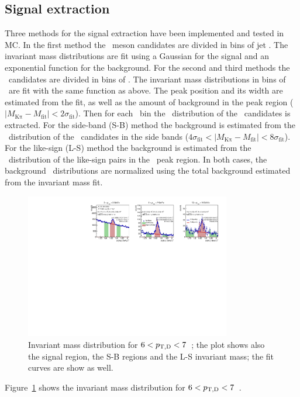 \subsection{Signal extraction}
Three methods for the signal extraction have been implemented and tested in MC.
In the first method the \Dzero\ meson candidates are divided in bins of jet \pt. The invariant mass distributions
are fit using a Gaussian for the signal and an exponential function for the background.
For the second and third methods the \Dzero\ candidates are divided in bins of \ptd. 
The invariant mass distributions in bins of \ptd\ are fit with the same function as above. The
peak position and its width are estimated from the fit, as well as the amount of background in the peak region ($|M_{\mathrm{K\pi}}-M_{\mathrm{fit}}| < 2\sigma_{\mathrm{fit}}$).
Then for each \ptd\ bin the \ptchjet\ distribution of the \Dzero\ candidates is extracted.
For the side-band (S-B) method the background is estimated from the \ptchjet\ distribution of the \Dzero\ candidates in the side bands (\mbox{$4\sigma_{\mathrm{fit}} < |M_{\mathrm{K\pi}}-M_{\mathrm{fit}}| < 8\sigma_{\mathrm{fit}}$}).
For the like-sign (L-S) method the background is estimated from the \ptchjet\ distribution of the like-sign pairs in the \Dzero\ peak region.
In both cases, the background \ptchjet\ distributions are normalized using the total background estimated from the invariant mass fit.
\begin{figure}[tbh]
\begin{center}
\includegraphics[width=0.8\textwidth]{img/HQ16_Simulation_InvMassSB}
 \caption{Invariant mass distribution for $6 < p_{\mathrm{T,D}} < 7$~\GeVc; the plot shows also the signal region, the S-B regions and the L-S invariant mass; the fit curves are show as well.} 
 \label{fig:HQ16_Simulation_InvMassSB}
\end{center}
\end{figure}
Figure~\ref{fig:HQ16_Simulation_InvMassSB} shows the invariant mass distribution for $6 < p_{\mathrm{T,D}} < 7$~\GeVc. 

